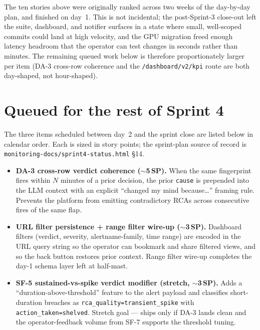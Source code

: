 \documentclass[11pt,a4paper,oneside]{report}
\begin{document}
The ten stories above were originally ranked across two weeks
of the day-by-day plan, and finished on day~1.  This is not
incidental; the post-Sprint-3 close-out left the suite,
dashboard, and notifier surfaces in a state where small,
well-scoped commits could land at high velocity, and the GPU
migration freed enough latency headroom that the operator can
test changes in seconds rather than minutes.  The remaining
queued work below is therefore proportionately larger per item
(DA-3 cross-row coherence and the \texttt{/dashboard/v2/kpi}
route are both day-shaped, not hour-shaped).

\section{Queued for the rest of Sprint 4}

The three items scheduled between day~2 and the sprint close are
listed below in calendar order.  Each is sized in story points;
the sprint-plan source of record is
\texttt{monitoring-docs/sprint4-status.html} \S14.

\begin{itemize}
  \item \textbf{DA-3 cross-row verdict coherence ($\sim$5\,SP).}
        When the same fingerprint fires within $N$ minutes of a
        prior decision, the prior \texttt{cause} is prepended
        into the LLM context with an explicit ``changed my mind
        because\ldots'' framing rule.  Prevents the platform
        from emitting contradictory RCAs across consecutive
        fires of the same flap.
  \item \textbf{URL filter persistence + range filter wire-up
        ($\sim$3\,SP).}  Dashboard filters (verdict, severity,
        alertname-family, time range) are encoded in the URL
        query string so the operator can bookmark and share
        filtered views, and so the back button restores prior
        context.  Range filter wire-up completes the day-1
        schema layer left at half-mast.
  \item \textbf{SF-5 sustained-vs-spike verdict modifier (stretch,
        $\sim$3\,SP).}  Adds a ``duration-above-threshold''
        feature to the alert payload and classifies short-duration
        breaches as \texttt{rca\_quality=transient\_spike} with
        \texttt{action\_taken=shelved}.  Stretch goal --- ships
        only if DA-3 lands clean and the operator-feedback volume
        from SF-7 supports the threshold tuning.
\end{itemize}
\end{document}
